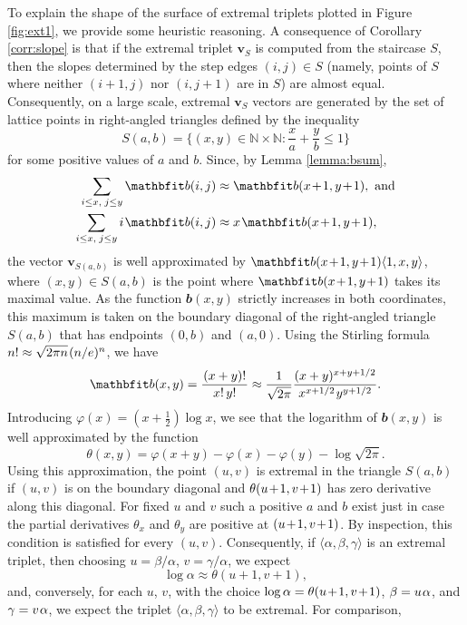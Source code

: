 \documentclass[reqno]{amsart}
\theoremstyle{definition}
\newcommand\tsp{\mkern 1.5mu}
\newcommand\N{\mathbb N}  %
\def\<{\langle}\def\>{\rangle}
\renewcommand\phi{\varphi}
\def\b{\mathbfit b}
\def\m#1{\tsp{#1}\tsp}
\begin{document}
To explain the shape of the surface of extremal triplets plotted in Figure
\ref{fig:ext1}, we provide some heuristic reasoning. A consequence of
Corollary \ref{corr:slope} is that if the extremal triplet $\mathbf v_S$ is
computed from the staircase $S$, then the slopes determined by the step
edges $(i,j)\in S$ (namely, points of $S$ where neither $(i+1,j)$ nor
$(i,j+1)$ are in $S$) are almost equal. Consequently, on a large scale,
extremal $\mathbf v_S$ vectors are generated by the set of lattice points in
right-angled triangles defined by the inequality
$$
   S(a,b) = \{ (x,y)\in \N\times\N : \frac x a + \frac y b \le 1 \}
$$
for some positive values of $a$ and $b$. Since, by Lemma \ref{lemma:bsum},
\begin{align*}
  \sum_{i\le x,\;j\le y} \b(i,j) & \approx \b(x\m+1,y\m+1), \mbox{ and}\\
  \sum_{i\le x,\;j\le y} i\tsp\b(i,j) & \approx x\tsp\b(x\m+1,y\m+1),
\end{align*}
the vector $\mathbf v_{S(a,b)}$ is well approximated by
$\b(x\m+1,y\m+1)\<1,x, y\>$, where $(x,y)\in S(a,b)$ is the point where
$\b(x\m+1,y\m+1)$ takes its maximal value. As the function $\b(x,y)$
strictly increases in both coordinates, this maximum is taken on the
boundary diagonal of the right-angled triangle $S(a,b)$ that has endpoints
$(0,b)$ and $(a,0)$. Using the Stirling formula $n! \approx \sqrt{2\pi
n}\tsp(n/e)^n$, we have
$$
   \b(x,y) = \frac{\tsp(x+y)!\tsp}{x!\, y!}
   \approx \frac{1}{\sqrt{2\pi}}\frac{(x+y)^{x+y+1/2}}
       {x^{x+1/2}\tsp y^{y+1/2}}.
$$
Introducing $\phi(x)=(x+\frac12)\log x$, we see that the logarithm of
$\b(x,y)$ is well approximated by the function
$$
  \theta(x,y) = \phi(x+y)-\phi(x)-\phi(y) -\log \sqrt{2\pi}.
$$
Using this approximation, the point $(u,v)$ is extremal in the triangle
$S(a,b)$ if $(u,v)$ is on the boundary diagonal and $\theta(u\m+1,v\m+1)$
has zero derivative along this diagonal. For fixed $u$ and $v$ such a
positive $a$ and $b$ exist just in case the partial derivatives $\theta_x$
and $\theta_y$ are positive at $(u\m+1,v\m+1)$. By inspection, this
condition is satisfied for every $(u,v)$. Consequently, if
$\<\alpha,\beta,\gamma\>$ is an extremal triplet, then choosing
$u=\beta/\alpha$, $v=\gamma/\alpha$, we expect
$$
   \log\alpha\approx\theta(u+1,v+1),
$$
and, conversely, for each $u$, $v$, with the choice $\log\alpha=
\theta(u\m+1,v\m+1)$, $\beta=u\tsp\alpha$, and $\gamma = v\tsp\alpha$,
we expect the triplet $\<\alpha,\beta,\gamma\>$ to be extremal.
For comparison,
\end{document}
